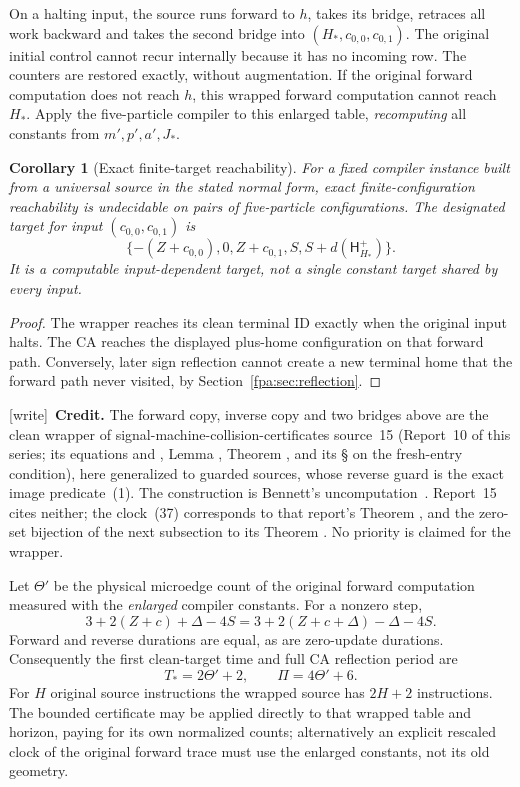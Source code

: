 \documentclass[11pt,a4paper]{article}
\numberwithin{equation}{section}
\newtheorem{corollary}[theorem]{Corollary}
\newcommand{\Hh}{\mathsf H}\newcommand{\Oo}{\mathsf O}\newcommand{\Ii}{\mathsf I}\newcommand{\HH}{\mathsf H}
\newcommand{\wtag}{\textup{[write]}}
\begin{document}
On a halting input, the source runs forward to $h$, takes its bridge, retraces
all work backward and takes the second bridge into $(H_*,c_{0,0},c_{0,1})$.
The original initial control cannot recur internally because it has no incoming
row. The counters are restored exactly, without augmentation. If the original
forward computation does not reach $h$, this wrapped forward computation
cannot reach $H_*$. Apply the five-particle compiler to this enlarged table,
\emph{recomputing} all constants from $m',p',a',J_*$.

\begin{corollary}[Exact finite-target reachability]\label{fpa:cor:exact}
For a fixed compiler instance built from a universal source in the stated
normal form, exact finite-configuration reachability is undecidable on pairs
of five-particle configurations. The designated target for input
$(c_{0,0},c_{0,1})$ is
\[
 \{-(Z+c_{0,0}),0,Z+c_{0,1},S,S+d(\Hh_{H_*}^+)\}.                 \tag{36}
\]
It is a computable \emph{input-dependent} target, not a single constant target
shared by every input.
\end{corollary}
\begin{proof}
The wrapper reaches its clean terminal ID exactly when the original input
halts. The CA reaches the displayed plus-home configuration on that forward
path. Conversely, later sign reflection cannot create a new terminal home
that the forward path never visited, by Section~\ref{fpa:sec:reflection}.
\end{proof}

\wtag\ \textbf{Credit.} The forward copy, inverse copy and two bridges above are the clean wrapper of signal-machine-collision-certificates source~15 (Report~10 of this series; its equations  and , Lemma , Theorem , and its \S{} on the fresh-entry condition), here generalized to guarded sources, whose reverse guard is the exact image predicate~(1). The construction is Bennett's uncomputation~\cite{fpa:bennett}. Report~15 cites neither; the clock~(37) corresponds to that report's Theorem , and the zero-set bijection of the next subsection to its Theorem . No priority is claimed for the wrapper.

Let $\Theta'$ be the physical microedge count of the original forward
computation measured with the \emph{enlarged} compiler constants. For a
nonzero step,
\[
 3+2(Z+c)+\Delta-4S
   =3+2(Z+c+\Delta)-\Delta-4S.
\]
Forward and reverse durations are equal, as are zero-update durations.
Consequently the first clean-target time and full CA reflection period are
\[
                  T_*=2\Theta'+2,\qquad \Pi=4\Theta'+6.           \tag{37}
\]
For $H$ original source instructions the wrapped source has $2H+2$
instructions. The bounded certificate may be applied directly to that
wrapped table and horizon, paying for its own normalized counts; alternatively
an explicit rescaled clock of the original forward trace must use the enlarged
constants, not its old geometry.
\end{document}
